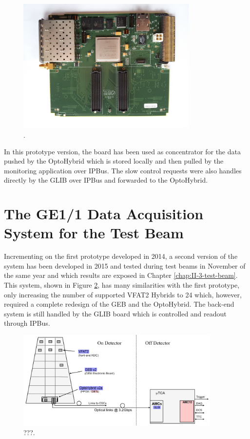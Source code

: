       \begin{figure}[h!]
        \centering
        \includegraphics[width=0.8\textwidth]{img/II-2-daq/glib.jpg}
        \caption{\cite{Vichoudis:1359270}.}
        \label{fig:II-2-glib}
      \end{figure}

       In this prototype version, the board has been used as concentrator for the data pushed by the OptoHybrid which is stored locally and then pulled by the monitoring application over IPBus. The slow control requests were also handles directly by the GLIB over IPBus and forwarded to the OptoHybrid.

  \section{The GE1/1 Data Acquisition System for the Test Beam}

    Incrementing on the first prototype developed in 2014, a second version of the system has been developed in 2015 and tested during test beams in November of the same year and which results are exposed in Chapter \ref{chap:II-3-test-beam}. This system, shown in Figure \ref{fig:II-2-gem-system-v2a}, has many similarities with the first prototype, only increasing the number of supported VFAT2 Hybrids to 24 which, however, required a complete redesign of the GEB and the OptoHybrid. The back-end system is still handled by the GLIB board which is controlled and readout through IPBus.

    \begin{figure}[h!]
      \centering
      \includegraphics[width=0.9\textwidth]{img/II-2-daq/gem-system-v2a.pdf}
      \caption{???.}
      \label{fig:II-2-gem-system-v2a}
    \end{figure}


